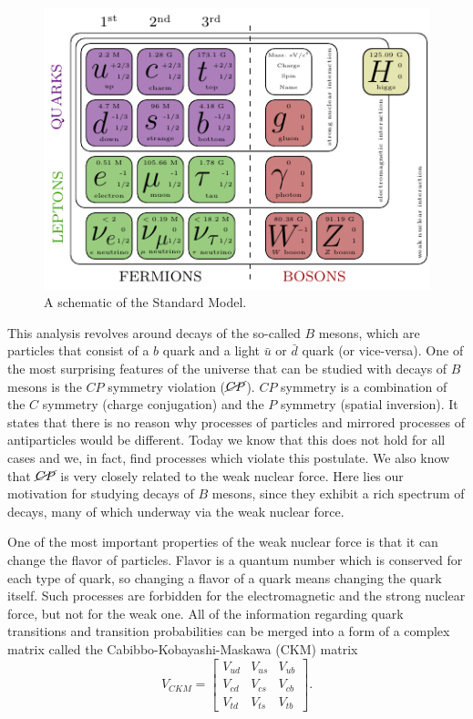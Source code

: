 \begin{figure}[!htb]
\centering
\includegraphics[scale=1.6]{texfig/SM}
\captionsetup{width=.8\linewidth}
\caption{A schematic of the Standard Model.}
\label{fig:sm}
\end{figure}

This analysis revolves around decays of the so-called $B$ mesons, which are particles that consist of a $b$ quark and a light $\bar u$ or $\bar d$ quark (or vice-versa). One of the most surprising features of the universe that can be studied with decays of $B$ mesons is the $CP$ symmetry violation ($\cancel{CP}$). $CP$ symmetry is a combination of the $C$ symmetry (charge conjugation) and the $P$ symmetry (spatial inversion). It states that there is no reason why processes of particles and mirrored processes of antiparticles would be different. Today we know that this does not hold for all cases and we, in fact, find processes which violate this postulate. We also know that $\cancel{CP}$ is very closely related to the weak nuclear force. Here lies our motivation for studying decays of $B$ mesons, since they exhibit a rich spectrum of decays, many of which underway via the weak nuclear force.

One of the most important properties of the weak nuclear force is that it can change the flavor of particles. Flavor is a quantum number which is conserved for each type of quark, so changing a flavor of a quark means changing the quark itself. Such processes are forbidden for the electromagnetic and the strong nuclear force, but not for the weak one. All of the information regarding quark transitions and transition probabilities can be merged into a form of a complex matrix called the Cabibbo-Kobayashi-Maskawa (CKM) matrix \cite{cabibbo1963unitary,kobayashi1973cp}
\begin{equation}
V_{CKM} = \begin{bmatrix}
    V_{ud} & V_{us} & V_{ub}\\
    V_{cd} & V_{cs} & V_{cb}\\
    V_{td} & V_{ts} & V_{tb}
\end{bmatrix}.
\end{equation}

